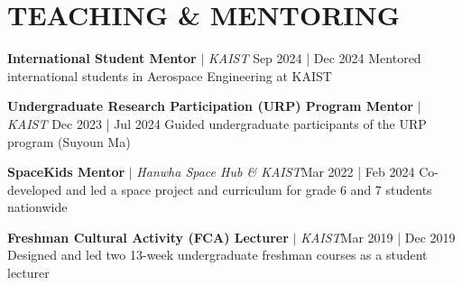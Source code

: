 \section{TEACHING \& MENTORING}
\resumeSubHeadingListStart
    \resumeProjectHeading
    {\textbf{International Student Mentor} $|$ \emph{KAIST}}    {Sep 2024 | Dec 2024}
    {Mentored international students in Aerospace Engineering at KAIST}{}
    
    \resumeProjectHeading
    {\textbf{Undergraduate Research Participation (URP) Program Mentor} $|$ \emph{KAIST}}    {Dec 2023 | Jul 2024}
    {Guided undergraduate participants of the URP program (Suyoun Ma)}{}
    
    \resumeProjectHeading
    {\textbf{SpaceKids Mentor} $|$ \emph{Hanwha Space Hub \& KAIST}}{Mar 2022 | Feb 2024}
    {Co-developed and led a space project and curriculum for grade 6 and 7 students nationwide}{}

    \resumeProjectHeading
    {\textbf{Freshman Cultural Activity (FCA) Lecturer} $|$ \emph{KAIST}}{Mar 2019 | Dec 2019}
    {Designed and led two 13-week undergraduate freshman courses as a student lecturer}{}

\resumeSubHeadingListEnd